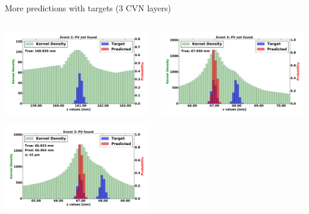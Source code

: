 \begin{frame}{More predictions with targets (3 CVN layers)}
  \begin{columns}[c]
        \begin{center}
            \includegraphics[width=1\textwidth,height=0.45\textwidth, trim=18 0 18 0]{images/120000_3layer_16.pdf}

            \includegraphics[width=1\textwidth, height=0.45\textwidth,trim=18 0 18 0]{images/120000_3layer_17.pdf}

        \end{center}
        \begin{center}
           \includegraphics[width=1\textwidth, height=0.45\textwidth, trim=18 0 18 0]{images/120000_3layer_18.pdf}


\end{center}
\end{columns}
\end{frame}
